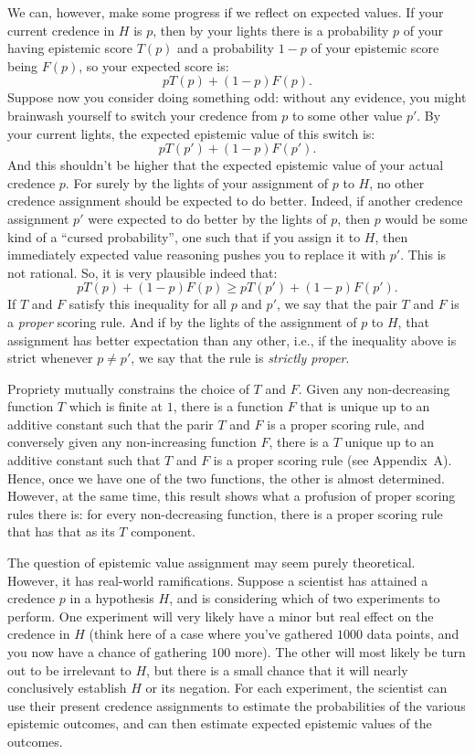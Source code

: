 We can, however, make some progress if we reflect on expected values. If your current credence in $H$ is $p$, then by your lights
there is a probability $p$ of your having epistemic score $T(p)$ and a probability $1-p$ of your epistemic score being $F(p)$, so
your expected score is:
$$
    p T(p) + (1-p) F(p).
$$
Suppose now you consider doing something odd: without any evidence, you might brainwash yourself to switch your credence from $p$ to some 
other value $p'$. By your current lights, the expected epistemic value of this switch is:
$$
    p T(p') + (1-p) F(p').
$$
And this shouldn't be higher that the expected epistemic value of your actual credence $p$. For surely by the lights of your
assignment of $p$ to $H$, no other credence assignment should be expected to do better. Indeed, if another credence assignment
$p'$ were expected to do better by the lights of $p$, then $p$ would be some kind of a ``cursed probability'', one such that
if you assign it to $H$, then immediately expected value reasoning pushes you to replace it with $p'$. This is not rational.
So, it is very plausible indeed that:
$$
    p T(p) + (1-p) F(p) \ge
    p T(p') + (1-p) F(p').
$$
If $T$ and $F$ satisfy this inequality for all $p$ and $p'$, we say that the pair $T$ and $F$ is a \textit{proper} scoring rule.
And if by the lights of the assignment of $p$ to $H$, that assignment has better expectation than any other, i.e., if the
inequality above is strict whenever $p\ne p'$, we say that the rule is \textit{strictly proper}.

Propriety mutually constrains the choice of $T$ and $F$. Given any non-decreasing function $T$ which is finite at
$1$, there is a
function $F$ that is unique up to an additive constant such that the parir $T$ and $F$ is a proper scoring rule, and conversely given
any non-increasing function $F$, there is a $T$ unique up to an additive constant such that $T$ and $F$ is a proper scoring rule (see Appendix~A).
Hence, once we have one of the two functions, the other is almost determined. However, at the same time, this result shows what
a profusion of proper scoring rules there is: for every non-decreasing function, there is a proper scoring rule that has that as 
its $T$ component.

The question of epistemic value assignment may seem purely theoretical. However, it has real-world ramifications. 
Suppose a scientist has attained a credence $p$ in a hypothesis $H$, and is considering which of two experiments to
perform. One experiment will very likely have a minor but real effect on the credence in $H$ (think here of a case
where you've gathered $1000$ data points, and you now have a chance of gathering $100$ more). The other will most
likely be turn out to be irrelevant to $H$, but there is a small chance that it will nearly conclusively establish
$H$ or its negation. For each experiment, the scientist can use their present credence assignments to estimate the
probabilities of the various epistemic outcomes, and can then estimate expected epistemic values of the outcomes.

